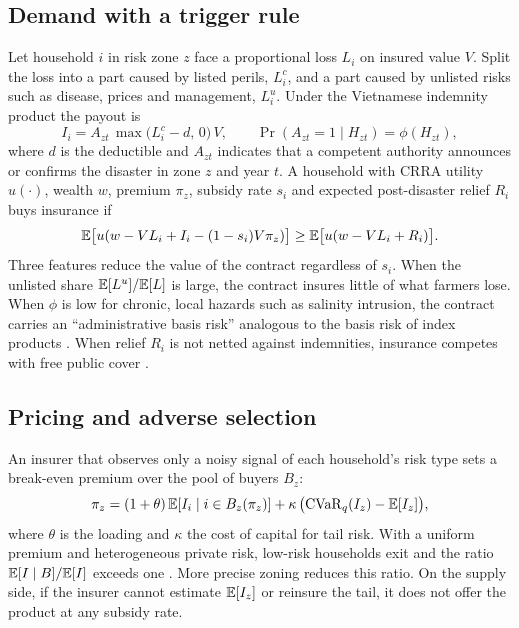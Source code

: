 \documentclass[11pt,a4paper]{article}
\begin{document}
\subsection{Demand with a trigger rule}

Let household $i$ in risk zone $z$ face a proportional loss $L_i$ on insured value $V$. Split the loss into a part caused by listed perils, $L^{c}_i$, and a part caused by unlisted risks such as disease, prices and management, $L^{u}_i$. Under the Vietnamese indemnity product the payout is
\begin{equation}
I_i = A_{zt}\,\max\big(L^{c}_i - d,\,0\big)\,V, \qquad \Pr(A_{zt} = 1 \mid H_{zt}) = \phi(H_{zt}),
\label{eq:trigger}
\end{equation}
where $d$ is the deductible and $A_{zt}$ indicates that a competent authority announces or confirms the disaster in zone $z$ and year $t$. A household with CRRA utility $u(\cdot)$, wealth $w$, premium $\pi_z$, subsidy rate $s_i$ and expected post-disaster relief $R_i$ buys insurance if
\begin{equation}
\mathbb{E}\big[u(w - VL_i + I_i - (1-s_i)V\pi_z)\big] \geq \mathbb{E}\big[u(w - VL_i + R_i)\big].
\label{eq:demand}
\end{equation}
Three features reduce the value of the contract regardless of $s_i$. When the unlisted share $\mathbb{E}[L^{u}]/\mathbb{E}[L]$ is large, the contract insures little of what farmers lose. When $\phi$ is low for chronic, local hazards such as salinity intrusion, the contract carries an ``administrative basis risk'' analogous to the basis risk of index products \parencite{clarke2016,jensen2016}. When relief $R_i$ is not netted against indemnities, insurance competes with free public cover \parencite{raschky2007,kousky2018}.

\subsection{Pricing and adverse selection}

An insurer that observes only a noisy signal of each household's risk type sets a break-even premium over the pool of buyers $B_z$:
\begin{equation}
\pi_z = (1+\theta)\,\mathbb{E}[I_i \mid i \in B_z(\pi_z)] + \kappa\,\big(\mathrm{CVaR}_{q}(I_z) - \mathbb{E}[I_z]\big),
\label{eq:premium}
\end{equation}
where $\theta$ is the loading and $\kappa$ the cost of capital for tail risk. With a uniform premium and heterogeneous private risk, low-risk households exit and the ratio $\mathbb{E}[I \mid B]/\mathbb{E}[I]$ exceeds one \parencite{rothschild1976,just1999}. More precise zoning reduces this ratio. On the supply side, if the insurer cannot estimate $\mathbb{E}[I_z]$ or reinsure the tail, it does not offer the product at any subsidy rate.
\end{document}
